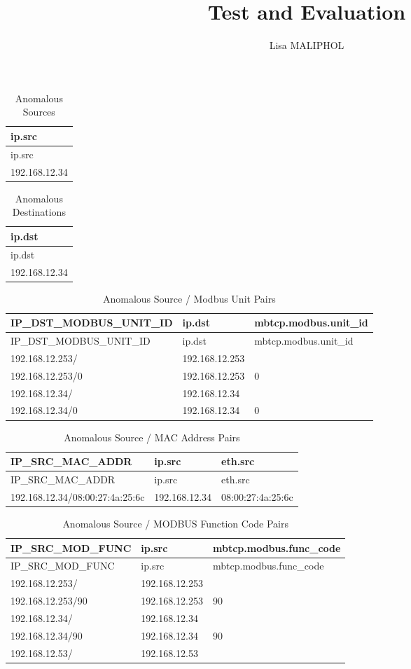 \documentclass[12pt,]{article}
\title{Test and Evaluation}
\author{Lisa MALIPHOL}
\date{}
\begin{document}
\maketitle


\begin{longtable}[c]{@{}l@{}}
\caption{Anomalous Sources}\tabularnewline
\toprule
ip.src\tabularnewline
\midrule
\endfirsthead
\toprule
ip.src\tabularnewline
\midrule
\endhead
192.168.12.34\tabularnewline
\bottomrule
\end{longtable}

\begin{longtable}[c]{@{}l@{}}
\caption{Anomalous Destinations}\tabularnewline
\toprule
ip.dst\tabularnewline
\midrule
\endfirsthead
\toprule
ip.dst\tabularnewline
\midrule
\endhead
192.168.12.34\tabularnewline
\bottomrule
\end{longtable}

\begin{longtable}[c]{@{}lll@{}}
\caption{Anomalous Source / Modbus Unit Pairs}\tabularnewline
\toprule
IP\_DST\_MODBUS\_UNIT\_ID & ip.dst &
mbtcp.modbus.unit\_id\tabularnewline
\midrule
\endfirsthead
\toprule
IP\_DST\_MODBUS\_UNIT\_ID & ip.dst &
mbtcp.modbus.unit\_id\tabularnewline
\midrule
\endhead
192.168.12.253/ & 192.168.12.253 &\tabularnewline
192.168.12.253/0 & 192.168.12.253 & 0\tabularnewline
192.168.12.34/ & 192.168.12.34 &\tabularnewline
192.168.12.34/0 & 192.168.12.34 & 0\tabularnewline
\bottomrule
\end{longtable}

\begin{longtable}[c]{@{}lll@{}}
\caption{Anomalous Source / MAC Address Pairs}\tabularnewline
\toprule
IP\_SRC\_MAC\_ADDR & ip.src & eth.src\tabularnewline
\midrule
\endfirsthead
\toprule
IP\_SRC\_MAC\_ADDR & ip.src & eth.src\tabularnewline
\midrule
\endhead
192.168.12.34/08:00:27:4a:25:6c & 192.168.12.34 &
08:00:27:4a:25:6c\tabularnewline
\bottomrule
\end{longtable}

\begin{longtable}[c]{@{}lll@{}}
\caption{Anomalous Source / MODBUS Function Code Pairs}\tabularnewline
\toprule
IP\_SRC\_MOD\_FUNC & ip.src & mbtcp.modbus.func\_code\tabularnewline
\midrule
\endfirsthead
\toprule
IP\_SRC\_MOD\_FUNC & ip.src & mbtcp.modbus.func\_code\tabularnewline
\midrule
\endhead
192.168.12.253/ & 192.168.12.253 &\tabularnewline
192.168.12.253/90 & 192.168.12.253 & 90\tabularnewline
192.168.12.34/ & 192.168.12.34 &\tabularnewline
192.168.12.34/90 & 192.168.12.34 & 90\tabularnewline
192.168.12.53/ & 192.168.12.53 &\tabularnewline
\bottomrule
\end{longtable}
\end{document}
